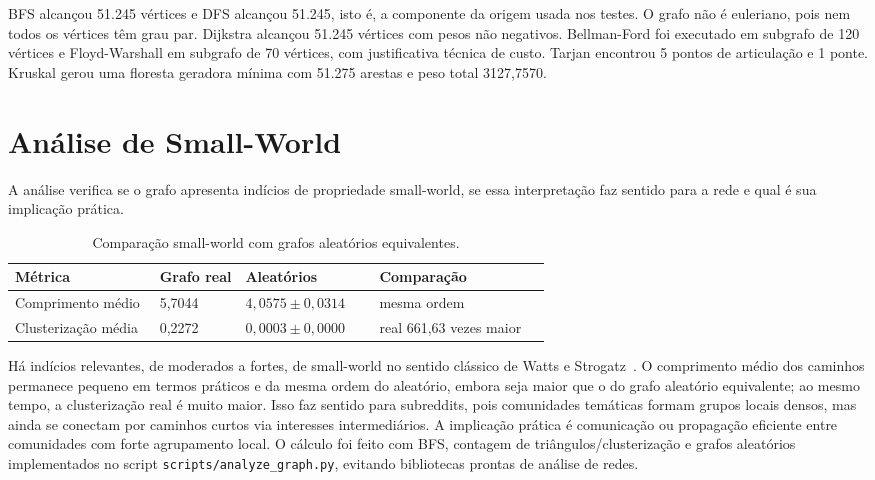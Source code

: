 \documentclass[sigconf]{webmedia}
\begin{document}
BFS alcançou 51.245 vértices e DFS alcançou 51.245, isto é, a componente
da origem usada nos testes. O grafo não é euleriano, pois nem todos os
vértices têm grau par. Dijkstra alcançou 51.245 vértices com pesos não
negativos. Bellman-Ford foi executado em subgrafo de 120 vértices e
Floyd-Warshall em subgrafo de 70 vértices, com justificativa técnica de
custo. Tarjan encontrou 5 pontos de articulação e 1 ponte. Kruskal gerou
uma floresta geradora mínima com 51.275 arestas e peso total 3127,7570.

\section{Análise de Small-World}

A análise verifica se o grafo apresenta indícios de propriedade small-world, se essa
interpretação faz sentido para a rede e qual é sua implicação prática.

\begin{table}
  \caption{Comparação small-world com grafos aleatórios equivalentes.}
  \label{tab:small-world}
  \small
  \setlength{\tabcolsep}{3pt}
  \begin{tabularx}{\linewidth}{@{}p{0.27\linewidth}p{0.16\linewidth}p{0.25\linewidth}X@{}}
    \toprule
    Métrica & Grafo real & Aleatórios & Comparação \\
    \midrule
    Comprimento médio & 5,7044 & $4,0575 \pm 0,0314$ & mesma ordem \\
    Clusterização média & 0,2272 & $0,0003 \pm 0,0000$ & real 661,63 vezes maior \\
    \bottomrule
  \end{tabularx}
\end{table}

Há indícios relevantes, de moderados a fortes, de small-world no sentido
clássico de Watts e Strogatz~\cite{watts1998collective}. O
comprimento médio dos caminhos permanece pequeno em termos práticos e da
mesma ordem do aleatório, embora seja maior que o do grafo aleatório
equivalente; ao mesmo tempo, a clusterização real é muito maior. Isso faz
sentido para subreddits, pois comunidades temáticas formam grupos locais
densos, mas ainda se conectam por caminhos curtos via interesses
intermediários. A implicação prática é comunicação ou propagação
eficiente entre comunidades com forte agrupamento local. O cálculo foi
feito com BFS, contagem de triângulos/clusterização e grafos aleatórios
implementados no script \texttt{scripts/analyze\_graph.py}, evitando
bibliotecas prontas de análise de redes.
\end{document}
